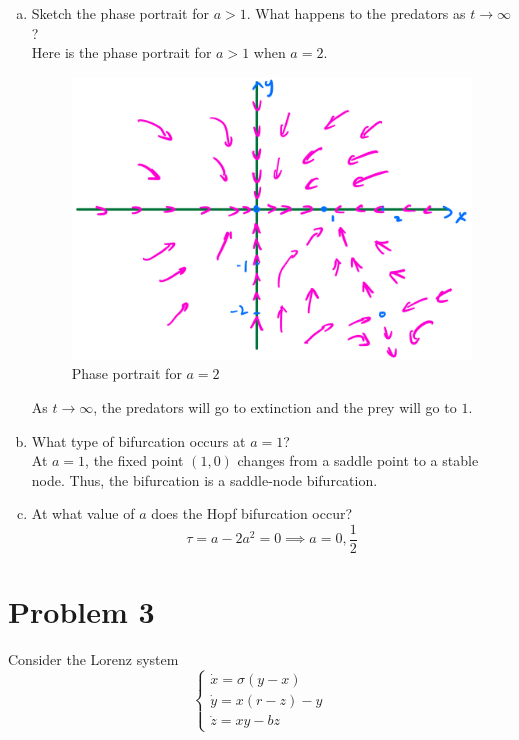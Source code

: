 \documentclass[12pt]{exam}
\begin{document}
\begin{enumerate}[(a)]
	\item Sketch the phase portrait for $a >1$. What happens to the predators as $t \to \infty$? \\
		Here is the phase portrait for $a > 1$ when $a = 2$.
		\begin{figure}[H]
			\centering
			\includegraphics[width=0.8\linewidth]{2c.jpeg}
			\caption{Phase portrait for $a = 2$}
			\label{fig:2c}
		\end{figure}

		As $t \to \infty$, the predators will go to extinction and the prey will go to $1$.
	
	\item What type of bifurcation occurs at $a = 1$? \\
	At $a = 1$, the fixed point $(1,0)$ changes from a saddle point to a stable node. Thus, the bifurcation is a saddle-node bifurcation.

	\item At what value of $a$ does the Hopf bifurcation occur? 
	\[ \tau = a-2a^2 = 0 \implies a = 0, \frac{1}{2} \]


\end{enumerate}


\section*{Problem 3}
Consider the Lorenz system
\[ \begin{cases}
	\dot{x} = \sigma(y-x) \\
	\dot{y} = x(r - z) - y \\
	\dot{z} = xy - bz
\end{cases} \]
\end{document}
